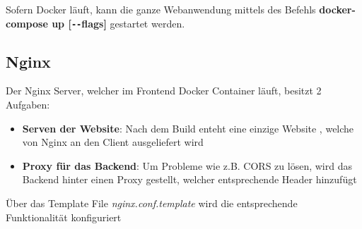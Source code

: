Sofern Docker läuft, kann die ganze Webanwendung mittels des Befehls \textbf{docker-compose up [\texttt{-{}-}flags]} gestartet werden.

\subsection{Nginx}\label{ch:nginx}
Der Nginx Server, welcher im Frontend Docker Container läuft, besitzt 2 Aufgaben:
\begin{itemize}
\item \textbf{Serven der Website}: Nach dem Build enteht eine einzige Website , welche von Nginx an den Client ausgeliefert wird
\item \textbf{Proxy für das Backend}: Um Probleme wie z.B. CORS zu lösen, wird das Backend hinter einen Proxy gestellt, welcher entsprechende Header hinzufügt
\end{itemize}

Über das Template File \textit{nginx.conf.template} wird die entsprechende Funktionalität konfiguriert

